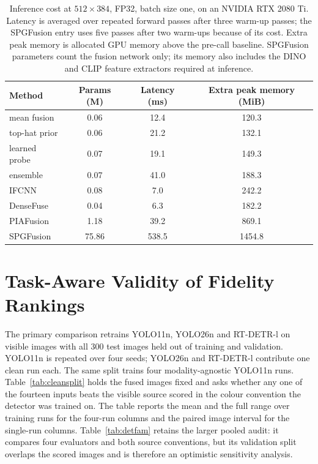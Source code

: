 \documentclass[10pt,a4paper]{article}
\begin{document}
\begin{sloppypar}
\begin{table}[!t]
\caption{Inference cost at $512\times384$, FP32, batch size one, on an NVIDIA
RTX 2080 Ti. Latency is averaged over repeated forward passes after three warm-up passes;
the SPGFusion entry uses five passes after two warm-ups because of its cost. Extra peak
memory is allocated GPU memory above the pre-call baseline. SPGFusion parameters count
the fusion network only; its memory also includes the DINO and CLIP feature extractors
required at inference.}\label{tab:cost}
\setlength{\tabcolsep}{4pt}
\begin{tabular*}{\linewidth}{@{\extracolsep{\fill}}l SSS@{}}
\toprule
Method & {Params (M)} & {Latency (ms)} & {Extra peak memory (MiB)}\\
\midrule
mean fusion & 0.06 & 12.4 & 120.3\\
top-hat prior & 0.06 & 21.2 & 132.1\\
learned probe & 0.07 & 19.1 & 149.3\\
ensemble & 0.07 & 41.0 & 188.3\\
IFCNN~\cite{zhang2020} & 0.08 & 7.0 & 242.2\\
DenseFuse~\cite{li2019} & 0.04 & 6.3 & 182.2\\
PIAFusion~\cite{tang2022} & 1.18 & 39.2 & 869.1\\
SPGFusion~\cite{zhang2026} & 75.86 & 538.5 & 1454.8\\
\bottomrule
\end{tabular*}

\end{table}
\end{sloppypar}

\section{Task-Aware Validity of Fidelity Rankings}
\label{sec:detect}

The primary comparison retrains YOLO11n, YOLO26n and RT-DETR-l on visible images with
all 300 test images held out of training and validation. YOLO11n is repeated over four
seeds; YOLO26n and RT-DETR-l contribute one clean run each. The same split trains four
modality-agnostic YOLO11n runs. Table~\ref{tab:cleansplit} holds the fused images fixed
and asks whether any one of the fourteen inputs beats the visible source scored in the
colour convention the detector was trained on. The table reports the mean and the full
range over training runs for the four-run columns and the paired image interval for
the single-run columns. Table~\ref{tab:detfam} retains the larger pooled audit: it compares four
evaluators and both source conventions, but its validation split overlaps the scored
images and is therefore an optimistic sensitivity analysis.
\end{document}
